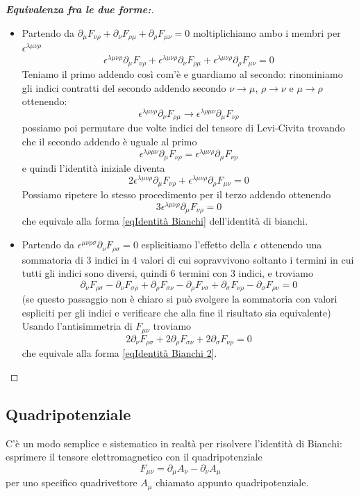 \documentclass[12pt,a4paper,titlepage, twoside, openright]{book}
\newenvironment{proofT}[1][\proofname]{  %
  \begin{proof}[\bfseries #1:]$ $\par\nobreak\ignorespaces\noindent
  }{
  \end{proof}
}
\numberwithin{equation}{chapter}
\begin{document}
 
\begin{proofT}[Equivalenza fra le due forme]
\begin{itemize}
\item Partendo da $\partial_\mu F_{\nu\rho} + \partial_\nu F_{\rho\mu} + \partial_\rho F_{\mu\nu}=0$ moltiplichiamo ambo i membri per $\epsilon^{\lambda\mu\nu\rho}$ 
\[
\epsilon^{\lambda\mu\nu\rho}\partial_\mu F_{\nu\rho} + 
\epsilon^{\lambda\mu\nu\rho}\partial_\nu F_{\rho\mu} + 
\epsilon^{\lambda\mu\nu\rho}\partial_\rho F_{\mu\nu} =0
\]
Teniamo il primo addendo così com'è e guardiamo al secondo: rinominiamo gli indici contratti del secondo addendo secondo $\nu\rightarrow\mu$, $\rho\rightarrow\nu$ e $\mu\rightarrow\rho$ ottenendo:
\[
\epsilon^{\lambda\mu\nu\rho}\partial_\nu F_{\rho\mu} \rightarrow 
\epsilon^{\lambda\rho\mu\nu}\partial_\mu F_{\nu\rho}
\]
possiamo poi permutare due volte indici del tensore di Levi-Civita trovando che il secondo addendo è uguale al primo
\[
\epsilon^{\lambda\rho\mu\nu}\partial_\mu F_{\nu\rho}=
\epsilon^{\lambda\mu\nu\rho}\partial_\mu F_{\nu\rho}
\]
e quindi l'identità iniziale diventa
\[
2\epsilon^{\lambda\mu\nu\rho}\partial_\mu F_{\nu\rho} + 
\epsilon^{\lambda\mu\nu\rho}\partial_\rho F_{\mu\nu} =0
\]
Possiamo ripetere lo stesso procedimento per il terzo addendo ottenendo
\[
3\epsilon^{\lambda\mu\nu\rho}\partial_\mu F_{\nu\rho} =0
\]
che equivale alla forma \ref{eqIdentità Bianchi} dell'identità di bianchi.
\item Partendo da $\epsilon^{\mu\nu\rho\sigma}\partial_\nu F_{\rho\sigma}=0$ esplicitiamo l'effetto della $\epsilon$ ottenendo una sommatoria di $3$ indici in $4$ valori di cui sopravvivono soltanto i termini in cui tutti gli indici sono diversi, quindi $6$ termini con $3$ indici, e troviamo
\[
\partial_\nu F_{\rho\sigma} - \partial_\nu F_{\sigma\rho} + \partial_\rho F_{\sigma\nu} - \partial_\rho F_{\nu\sigma} + \partial_\sigma F_{\nu\rho} -\partial_\sigma F_{\rho\nu}=0
\]
(se questo passaggio non è chiaro si può svolgere la sommatoria con valori espliciti per gli indici e verificare che alla fine il risultato sia equivalente)
Usando l'antisimmetria di $F_{\mu\nu}$ troviamo
\[2\partial_\nu F_{\rho\sigma}+2\partial_\rho F_{\sigma\nu}+2\partial_\sigma F_{\nu\rho}=0
\]
che equivale alla forma \ref{eqIdentità Bianchi 2}. \qedhere
\end{itemize}
\end{proofT}


\subsection{Quadripotenziale}\label{sezQuadripotenziale}
C'è un modo semplice e sistematico in realtà per risolvere l'identità di Bianchi: esprimere il tensore elettromagnetico con il quadripotenziale
\begin{equation}\label{TensoreDaQuadripotenziale}
F_{\mu\nu}=\partial_\mu A_\nu -\partial_\nu A_\mu
\end{equation}
per uno specifico quadrivettore $A_\mu$ chiamato appunto quadripotenziale.
\end{document}
